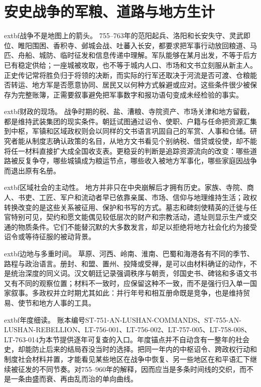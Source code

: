 \section{安史战争的军粮、道路与地方生计}
\label{sec:an-shi-military-logistics}

\noindent	extbf{战争不是地图上的箭头。} 755--763年的范阳起兵、洛阳和长安失守、灵武即位、睢阳围困、香积寺、邺城会战、吐蕃入长安，都要求把军事行动放回粮道、马匹、舟船、城防、临时征发和信息传递中理解。军队能够在某月出发，不等于后方已有稳定供给；一座城被攻取，也不等于城内人口、市场和文书立刻服从新主人。正史传记常将胜负归于将领的决断，而实际的行军还取决于河流是否可渡、仓粮能否转运、地方军是否愿意协同、居民又以何种方式躲避或应对。这些条件很少被保存为完整账簿，正需要叙事避免把军事数字和报功语句变成未经检验的事实。

\noindent	extbf{财政的现场。} 战争时期的税、盐、漕粮、寺院资产、市场关津和地方留截，都是维持武装集团的现实条件。朝廷试图通过诏令、使职、户籍与任命把资源汇集到中枢，军镇和区域政权则会以同样的文书语言巩固自己的军赏、人事和仓储。研究者能从制度志确认政策的名目，从地方文书看见个别纳税、借贷或役使，却不能将任一材料直接扩大成全国收支表。更稳妥的判断是追踪资源流向的改变：哪些道路被反复争夺，哪些城镇成为粮运节点，哪些收入被地方军事化，哪些家庭因战争而退出原有名册。

\noindent	extbf{区域社会的主动性。} 地方并非只在中央崩解后才拥有历史。家族、寺院、商人、书吏、工匠、军户和流动者早已依靠亲属、市场、信仰与地理维持生活；政权转换改变的是这些关系被征用、保护和书写的方式。墓志和碑刻使精英的迁徙与任官特别可见，契约和愿文能偶见较低层次的财产和宗教活动，遗址则显示生产或交通的物质条件。它们不能替沉默的大多数发言，却足以拒绝将地方社会化约为接受诏令或等待征服的被动背景。

\noindent	extbf{边地与多重时间。} 草原、河西、岭南、淮南、巴蜀和海港各有不同的季节、路程与政治语言。册封、和盟、置州、投降或受禅，是可以由材料确证的动作，不是统治深度的同义词。汉文朝廷记录强调秩序与朝贡，邻国史书、碑铭和多语文书又有不同的观察位置；材料不一致时，应保留这种不一致，而不是强行归入单一国家叙事。多政权并立时期尤其如此：并行年号和相互册命既是竞争，也是维持贸易、使节和地方人事的工具。

\noindent	extbf{年度细读。} 账本编号ST-751-AN-LUSHAN-COMMANDS、ST-755-AN-LUSHAN-REBELLION、LT-756-001、LT-756-002、LT-757-005、LT-758-008、LT-763-014为本节提供逐年可复查的入口。年度锚点并不自动含有一整年的社会史，却能防止后来的结局吞没当时的选择。把同一年内的中枢诏令、跨政权行动和制度社会材料并置，才能看见某些地区在战争中恢复、另一些地区在和平语汇下继续被征发的不同节奏。对755--960年的解释，因而应当是多条时间线的交织，而不是一条由盛而衰、再由乱而治的单向曲线。

